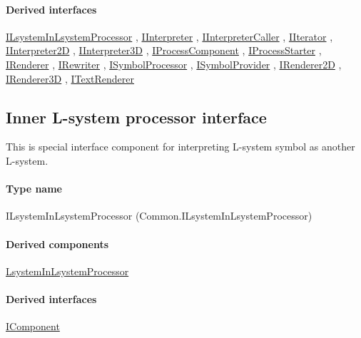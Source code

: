 	\paragraph{Derived interfaces}
		\hyperref[Malsys.Processing.Components.Common.ILsystemInLsystemProcessor]{ILsystemInLsystemProcessor}%
, 		\hyperref[Malsys.Processing.Components.IInterpreter]{IInterpreter}%
, 		\hyperref[Malsys.Processing.Components.IInterpreterCaller]{IInterpreterCaller}%
, 		\hyperref[Malsys.Processing.Components.IIterator]{IIterator}%
, 		\hyperref[Malsys.Processing.Components.Interpreters.IInterpreter2D]{IInterpreter2D}%
, 		\hyperref[Malsys.Processing.Components.Interpreters.IInterpreter3D]{IInterpreter3D}%
, 		\hyperref[Malsys.Processing.Components.IProcessComponent]{IProcessComponent}%
, 		\hyperref[Malsys.Processing.Components.IProcessStarter]{IProcessStarter}%
, 		\hyperref[Malsys.Processing.Components.IRenderer]{IRenderer}%
, 		\hyperref[Malsys.Processing.Components.IRewriter]{IRewriter}%
, 		\hyperref[Malsys.Processing.Components.ISymbolProcessor]{ISymbolProcessor}%
, 		\hyperref[Malsys.Processing.Components.ISymbolProvider]{ISymbolProvider}%
, 		\hyperref[Malsys.Processing.Components.Renderers.IRenderer2D]{IRenderer2D}%
, 		\hyperref[Malsys.Processing.Components.Renderers.IRenderer3D]{IRenderer3D}%
, 		\hyperref[Malsys.Processing.Components.Renderers.ITextRenderer]{ITextRenderer}%
	

\subsection{Inner L-system processor interface}
\label{Malsys.Processing.Components.Common.ILsystemInLsystemProcessor}
This is special interface component for interpreting L-system symbol as another L-system.\paragraph{Type name}
ILsystemInLsystemProcessor (Common.ILsystemInLsystemProcessor) 	\paragraph{Derived components}
		\hyperref[Malsys.Processing.Components.Common.LsystemInLsystemProcessor]{LsystemInLsystemProcessor}%
	\paragraph{Derived interfaces}
		\hyperref[Malsys.Processing.Components.IComponent]{IComponent}%
	
